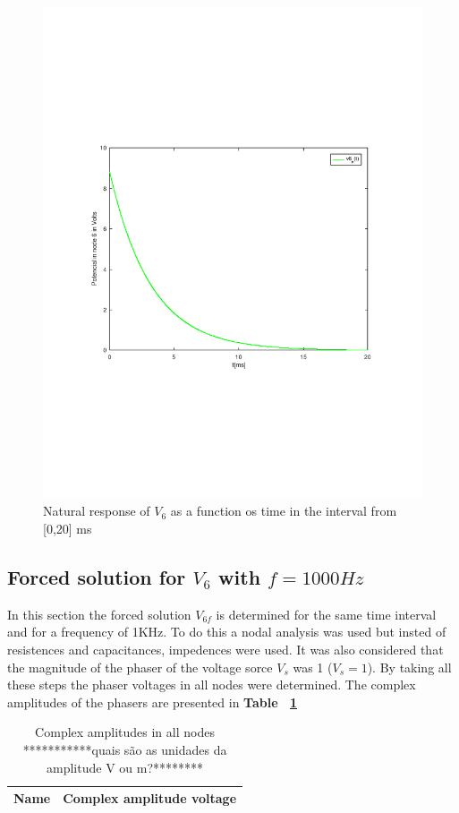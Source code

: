\begin{figure}[H] \centering
\includegraphics[width=0.9\linewidth]{natural_tab.pdf}
\caption{Natural response of $V_6$ as a function os time in the interval from [0,20] ms}
\label{fig:natural}
\end{figure} 

\pagebreak

\subsection{Forced solution for $V_6$ with $f=1000Hz$}

In this section the forced solution $V_{6f}$ is determined for the same time interval and for a frequency of 1KHz. To do this a nodal analysis was used but insted of resistences and capacitances, impedences were used. It was also  considered that the magnitude of the phaser of the voltage sorce $V_s$  was 1 ($V_s=1$). By taking all these steps the phaser voltages in all nodes were determined. The complex amplitudes of the phasers are presented in  \textbf{Table ~\ref{tab:equivalent resistor}}
\begin{table}[h!]
  \centering
  \begin{tabular}{|l|r|}
    \hline    
    {\bf Name} & {\bf Complex amplitude voltage}\\ \hline
    
  \end{tabular}
  \caption{Complex amplitudes in all nodes ***********quais são as unidades da amplitude V ou m?********}
  \label{tab:equivalent resistor}
\end{table}
\vspace{10cm}
\pagebreak

